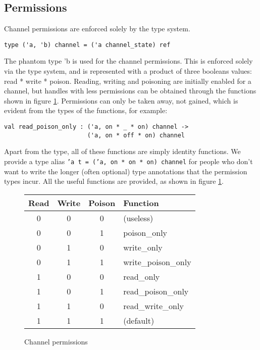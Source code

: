 \documentclass[a4paper,12pt]{article}
\begin{document}
\subsection{Permissions}

Channel permissions are enforced solely by the type system.

\begin{verbatim}
type ('a, 'b) channel = ('a channel_state) ref
\end{verbatim}

The phantom type 'b is used for the channel permissions. This is enforced solely via the type
system, and is represented with a product of three booleans values: read * write * poison.
Reading, writing and poisoning are initially enabled for a channel, but handles with less 
permissions can be obtained through the functions shown in figure \ref{channel-permissions}. 
Permissions can only be taken away, not gained, which is evident from the types of the 
functions, for example: 

\begin{verbatim}
val read_poison_only : ('a, on * _ * on) channel -> 
                       ('a, on * off * on) channel
\end{verbatim}

Apart from the type, all of these functions are simply identity functions. We provide a
type alias \texttt{'a t = ('a, on * on * on) channel} for people who don't want to write the
longer (often optional) type annotations that the permission types incur. All
the useful functions are provided, as shown in figure \ref{channel-permissions}.

\begin{figure}[h]
\centering
\begin{tabular}{c|c|c|l}
Read & Write & Poison & Function \\
\hline
0 & 0 & 0 & (useless) \\
0 & 0 & 1 & poison\_only \\
0 & 1 & 0 & write\_only \\
0 & 1 & 1 & write\_poison\_only \\
1 & 0 & 0 & read\_only \\
1 & 0 & 1 & read\_poison\_only \\
1 & 1 & 0 & read\_write\_only \\
1 & 1 & 1 & (default) \\
\end{tabular}
\caption{Channel permissions}
\label{channel-permissions}
\end{figure}
\end{document}
